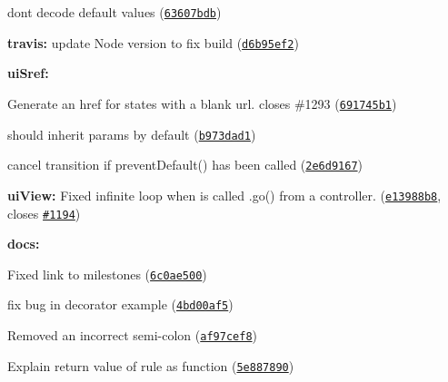 {{{{\begin{DoxyItemize}
\begin{DoxyItemize}
\item don\textquotesingle{}t decode default values (\href{https://github.com/angular-ui/ui-router/commit/63607bdbbcb432d3fb37856a1cb3da0cd496804e}{\tt 63607bdb})
\end{DoxyItemize}
\item {\bfseries travis\+:} update Node version to fix build (\href{https://github.com/angular-ui/ui-router/commit/d6b95ef23d9dacb4eba08897f5190a0bcddb3a48}{\tt d6b95ef2})
\item {\bfseries ui\+Sref\+:}
\begin{DoxyItemize}
\item Generate an href for states with a blank url. closes \#1293 (\href{https://github.com/angular-ui/ui-router/commit/691745b12fa05d3700dd28f0c8d25f8a105074ad}{\tt 691745b1})
\item should inherit params by default (\href{https://github.com/angular-ui/ui-router/commit/b973dad155ad09a7975e1476bd096f7b2c758eeb}{\tt b973dad1})
\item cancel transition if prevent\+Default() has been called (\href{https://github.com/angular-ui/ui-router/commit/2e6d9167d3afbfbca6427e53e012f94fb5fb8022}{\tt 2e6d9167})
\end{DoxyItemize}
\item {\bfseries ui\+View\+:} Fixed infinite loop when is called .go() from a controller. (\href{https://github.com/angular-ui/ui-router/commit/e13988b8cd6231d75c78876ee9d012cc87f4a8d9}{\tt e13988b8}, closes \href{https://github.com/angular-ui/ui-router/issues/1194}{\tt \#1194})
\item {\bfseries docs\+:}
\begin{DoxyItemize}
\item Fixed link to milestones (\href{https://github.com/angular-ui/ui-router/commit/6c0ae500cc238ea9fc95adcc15415c55fc9e1f33}{\tt 6c0ae500})
\item fix bug in decorator example (\href{https://github.com/angular-ui/ui-router/commit/4bd00af50b8b88a49d1545a76290731cb8e0feb1}{\tt 4bd00af5})
\item Removed an incorrect semi-\/colon (\href{https://github.com/angular-ui/ui-router/commit/af97cef8b967f2e32177e539ef41450dca131a7d}{\tt af97cef8})
\item Explain return value of rule as function (\href{https://github.com/angular-ui/ui-router/commit/5e8878900a6ffe59a81aed531a3925e34a297377}{\tt 5e887890})
\end{DoxyItemize}
\end{DoxyItemize}}}}}

